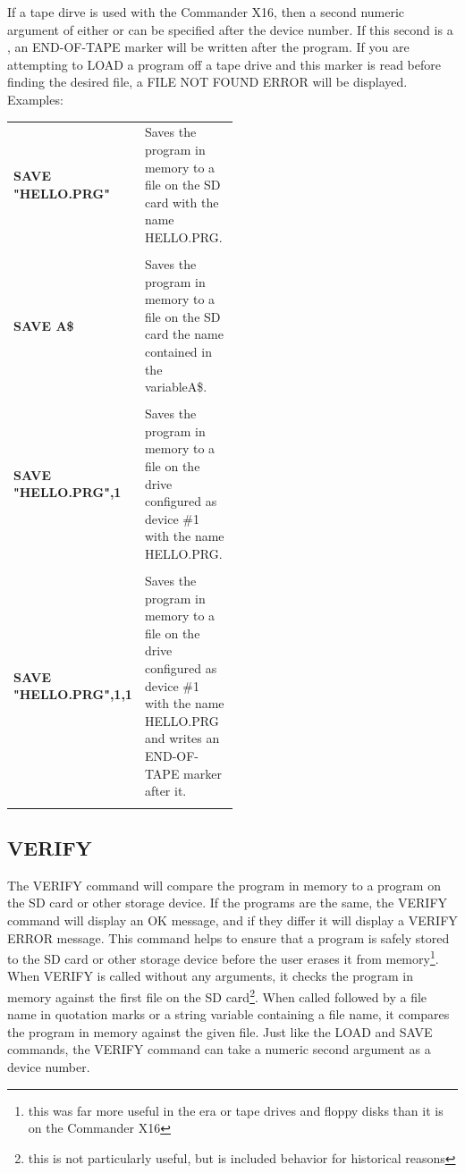 If a tape dirve is used with the Commander X16, then a second numeric argument
of either {} or {} can be specified after the device
number.  If this second is a {}, an {\ttfamily END-OF-TAPE} marker
will be written after the program.  If you are attempting to {\ttfamily LOAD} a
program off a tape drive and this marker is read before finding the desired
file, a {\ttfamily FILE NOT FOUND ERROR} will be displayed.\\

Examples:\\

\begin{tabular}{l p{0.5\linewidth}}

	{\ttfamily\bfseries SAVE "HELLO.PRG"}&Saves the program in memory to a file
	on the SD card with the name {\ttfamily HELLO.PRG}.\\\\

	{\ttfamily\bfseries SAVE A\$}&Saves the program in memory to a file on the
	SD card the name contained in the variable{\ttfamily A\$}.\\\\

	{\ttfamily\bfseries SAVE "HELLO.PRG",1}&Saves the program in memory to a
	file on the drive configured as device \#1 with the name {\ttfamily
	HELLO.PRG}.\\\\

	{\ttfamily\bfseries SAVE "HELLO.PRG",1,1}&Saves the program in memory to a
	file on the drive configured as device \#1 with the name {\ttfamily
	HELLO.PRG} and writes an {\ttfamily END-OF-TAPE} marker after it.\\\\

\end{tabular}

\subsection{VERIFY}

The {\ttfamily VERIFY} command will compare the program in memory to a program
on the SD card or other storage device.  If the programs are the same, the
{\ttfamily VERIFY} command will display an {\ttfamily OK} message, and if they
differ it will display a {\ttfamily VERIFY ERROR} message.  This command helps
to ensure that a program is safely stored to the SD card or other storage
device before the user erases it from memory\footnote{this was far more useful
in the era or tape drives and floppy disks than it is on the Commander X16}.
When {\ttfamily VERIFY} is called without any arguments, it checks the program
in memory against the first file on the SD card\footnote{this is not
particularly useful, but is included behavior for historical reasons}.  When
called followed by a file name in quotation marks or a string variable
containing a file name, it compares the program in memory against the given
file.  Just like the {\ttfamily LOAD} and {\ttfamily SAVE} commands, the
{\ttfamily VERIFY} command can take a numeric second argument as a device
number.\\

